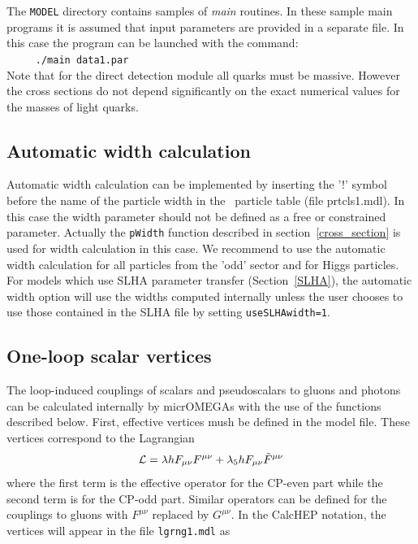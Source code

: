 \documentclass[12pt,a4paper]{article}
\begin{document}
The {\tt MODEL} directory contains  samples of {\it main}
routines. In these sample main programs it is assumed that input parameters are provided in a separate
file. In this case the  program can be launched with the command:\\
\verb|     ./main data1.par|\\
Note that for the direct detection module all quarks must be  massive. 
However the cross sections do not depend significantly on the exact  
numerical values for the masses of light quarks.

 
\subsection{Automatic width calculation}
Automatic width calculation can be 
implemented by  inserting the '!' symbol before the name of the particle width  in 
the \calchep\ particle table (file prtcls1.mdl). In this case the width parameter 
should not be defined as a free or constrained parameter. 
Actually the \verb|pWidth| function  described in section~\ref{cross_section} is  used for width calculation in this case.
We recommend to use the
automatic width calculation for all particles from the 'odd' sector and for
Higgs particles. 
For models which use SLHA parameter transfer (Section~\ref{SLHA}), 
the automatic width option will use the widths computed internally unless the user chooses to use those contained  in the SLHA file  by setting {\tt useSLHAwidth=1}. 


\subsection{One-loop scalar vertices}

The loop-induced  couplings of scalars and pseudoscalars to  gluons and photons can be calculated internally by micrOMEGAs with the use of the functions described below. First, effective vertices mush be defined in the model file. These vertices  correspond to the Lagrangian 
\begin{equation}
{\cal L}= \lambda h F_{\mu\nu} F^{\mu\nu} +\lambda_5 h F_{\mu\nu} \tilde{F}^{\mu\nu}
\label{eq:Leff}
\end{equation}
where the first term is the effective operator for the CP-even part while the second term is for the CP-odd part. Similar operators can be defined for the couplings to gluons with $F^{\mu\nu}$ replaced by $G^{\mu\nu}$. In the CalcHEP notation, the vertices will appear in the file \verb|lgrng1.mdl| as
\end{document}
